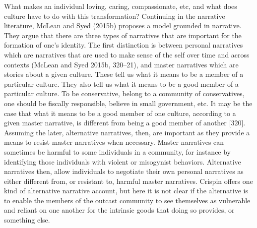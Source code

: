 \documentclass[12pt]{book}
\theoremstyle{definition}
\theoremstyle{remark}
\begin{document}
What makes an individual loving, caring, compassionate, etc, and what does culture have to do with this transformation? Continuing in the narrative literature, McLean and Syed (2015b) proposes a model grounded in narrative. They argue that there are three types of narratives that are important for the formation of one's identity. The first distinction is between personal narratives which are narratives that are used to make sense of the self over time and across contexts (McLean and Syed 2015b, 320--21), and master narratives which are stories about a given culture. These tell us what it means to be a member of a particular culture. They also tell us what it means to be a good member of a particular culture. To be conservative, belong to a community of conservatives, one should be fiscally responsible, believe in small government, etc. It may be the case that what it means to be a good member of one culture, according to a given master narrative, is different from being a good member of another {[}320{]}. Assuming the later, alternative narratives, then, are important as they provide a means to resist master narratives when necessary. Master narratives can sometimes be harmful to some individuals in a community, for instance by identifying those individuals with violent or misogynist behaviors. Alternative narratives then, allow individuals to negotiate their own personal narratives as either different from, or resistant to, harmful master narratives. Crispin offers one kind of alternative narrative account, but here it is not clear if the alternative is to enable the members of the outcast community to see themselves as vulnerable and reliant on one another for the intrinsic goods that doing so provides, or something else.
\end{document}

